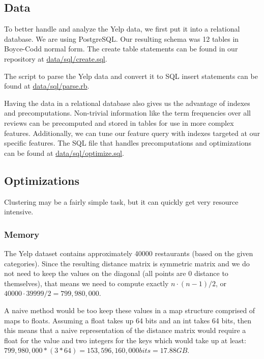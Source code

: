 \documentclass{article}
\begin{document}
\subsection{Data}
To better handle and analyze the Yelp data, we first put it into a relational database.
We are using PostgreSQL.
Our resulting schema was 12 tables in Boyce-Codd normal form.
The create table statements can be found in our repository at \href{https://github.com/eriq-augustine/242-2016/blob/master/data/sql/create.sql}{data/sql/create.sql}.

The script to parse the Yelp data and convert it to SQL insert statements can be found at \href{https://github.com/eriq-augustine/242-2016/blob/master/data/sql/parse.rb}{data/sql/parse.rb}.

Having the data in a relational database also gives us the advantage of indexes and precomputations.
Non-trivial information like the term frequencies over all reviews can be precomputed and stored in tables for use in more complex features.
Additionally, we can tune our feature query with indexes targeted at our specific features.
The SQL file that handles precomputations and optimizations can be found at \href{https://github.com/eriq-augustine/242-2016/blob/master/data/sql/optimize.sql}{data/sql/optimize.sql}.

\subsection{Optimizations}
Clustering may be a fairly simple task, but it can quickly get very resource intensive.

\subsubsection{Memory}
The Yelp dataset contains approximately 40000 restaurants (based on the given categories).
Since the resulting distance matrix is symmetric matrix and we do not need to keep the values on the diagonal (all points are 0 distance to themselves), that means we need to compute exactly $ n \cdot (n - 1) / 2 $, or $ 40000 \cdot 39999 / 2  = 799,980,000 $.

A naive method would be too keep these values in a map structure comprised of maps to floats.
Assuming a float takes up 64 bits and an int takes 64 bits,
then this means that a naive representation of the distance matrix would require a float for the value and two integers for the keys which would take up at least:
$ 799,980,000 * (3 * 64) = 153,596,160,000 bits = 17.88 GB $.
\end{document}
